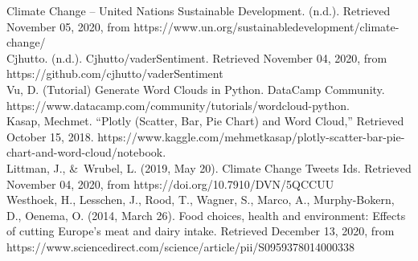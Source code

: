\documentclass[fontsize=11pt]{article}
\begin{document}
Climate Change – United Nations Sustainable Development. (n.d.). Retrieved November 05, 2020, from https://www.un.org/sustainabledevelopment/climate-change/ \\

Cjhutto. (n.d.). Cjhutto/vaderSentiment. Retrieved November 04, 2020, from https://github.com/cjhutto/vaderSentiment \\

Vu, D. (Tutorial) Generate Word Clouds in Python. DataCamp Community. https://www.datacamp.com/community/tutorials/wordcloud-python. \\

Kasap, Mechmet. “Plotly (Scatter, Bar, Pie Chart) and Word Cloud,” Retrieved October 15, 2018. https://www.kaggle.com/mehmetkasap/plotly-scatter-bar-pie-chart-and-word-cloud/notebook. \\

Littman, J., \&\ Wrubel, L. (2019, May 20). Climate Change Tweets Ids. Retrieved November 04, 2020, from https://doi.org/10.7910/DVN/5QCCUU \\

Westhoek, H., Lesschen, J., Rood, T., Wagner, S., Marco, A., Murphy-Bokern, D., Oenema, O. (2014, March 26). Food choices, health and environment: Effects of cutting Europe's meat and dairy intake. Retrieved December 13, 2020, from https://www.sciencedirect.com/science/article/pii/S0959378014000338 \\


\end{document}
